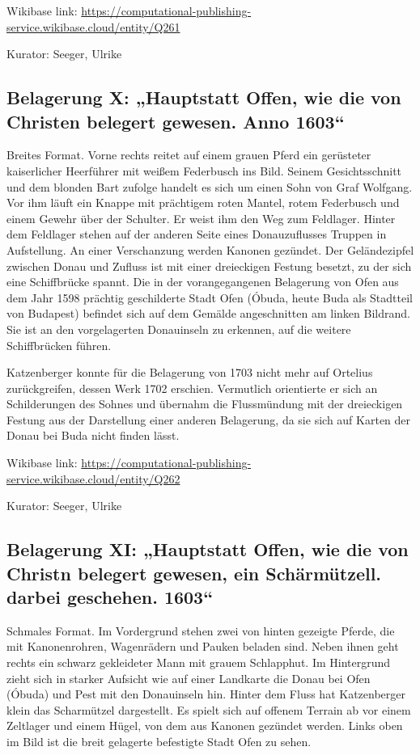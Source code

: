 \documentclass[
  11pt,
  a4paper,
  openany]{book}
\begin{document}
Wikibase link:
\url{https://computational-publishing-service.wikibase.cloud/entity/Q261}

Kurator: Seeger, Ulrike

\subsection{Belagerung X: „Hauptstatt Offen, wie die von Christen
belegert gewesen. Anno
1603``}\label{belagerung-x-hauptstatt-offen-wie-die-von-christen-belegert-gewesen.-anno-1603}

Breites Format. Vorne rechts reitet auf einem grauen Pferd ein
gerüsteter kaiserlicher Heerführer mit weißem Federbusch ins Bild.
Seinem Gesichtsschnitt und dem blonden Bart zufolge handelt es sich um
einen Sohn von Graf Wolfgang. Vor ihm läuft ein Knappe mit prächtigem
roten Mantel, rotem Federbusch und einem Gewehr über der Schulter. Er
weist ihm den Weg zum Feldlager. Hinter dem Feldlager stehen auf der
anderen Seite eines Donauzuflusses Truppen in Aufstellung. An einer
Verschanzung werden Kanonen gezündet. Der Geländezipfel zwischen Donau
und Zufluss ist mit einer dreieckigen Festung besetzt, zu der sich eine
Schiffbrücke spannt. Die in der vorangegangenen Belagerung von Ofen aus
dem Jahr 1598 prächtig geschilderte Stadt Ofen (Óbuda, heute Buda als
Stadtteil von Budapest) befindet sich auf dem Gemälde angeschnitten am
linken Bildrand. Sie ist an den vorgelagerten Donauinseln zu erkennen,
auf die weitere Schiffbrücken führen.

Katzenberger konnte für die Belagerung von 1703 nicht mehr auf Ortelius
zurückgreifen, dessen Werk 1702 erschien. Vermutlich orientierte er sich
an Schilderungen des Sohnes und übernahm die Flussmündung mit der
dreieckigen Festung aus der Darstellung einer anderen Belagerung, da sie
sich auf Karten der Donau bei Buda nicht finden lässt.

Wikibase link:
\url{https://computational-publishing-service.wikibase.cloud/entity/Q262}

Kurator: Seeger, Ulrike

\subsection{Belagerung XI: „Hauptstatt Offen, wie die von Christn
belegert gewesen, ein Schärmützell. darbei geschehen.
1603``}\label{belagerung-xi-hauptstatt-offen-wie-die-von-christn-belegert-gewesen-ein-schuxe4rmuxfctzell.-darbei-geschehen.-1603}

Schmales Format. Im Vordergrund stehen zwei von hinten gezeigte Pferde,
die mit Kanonenrohren, Wagenrädern und Pauken beladen sind. Neben ihnen
geht rechts ein schwarz gekleideter Mann mit grauem Schlapphut. Im
Hintergrund zieht sich in starker Aufsicht wie auf einer Landkarte die
Donau bei Ofen (Óbuda) und Pest mit den Donauinseln hin. Hinter dem
Fluss hat Katzenberger klein das Scharmützel dargestellt. Es spielt sich
auf offenem Terrain ab vor einem Zeltlager und einem Hügel, von dem aus
Kanonen gezündet werden. Links oben im Bild ist die breit gelagerte
befestigte Stadt Ofen zu sehen.
\end{document}
